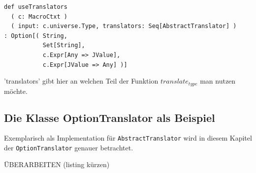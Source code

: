 \documentclass[12pt]{scrreprt}
\begin{document}
\begin{lstlisting}[caption=Statische Hilfsfunktion in AbstractTranslator, label=lst:hilfsfunktionen]
def useTranslators
  ( c: MacroCtxt )
  ( input: c.universe.Type, translators: Seq[AbstractTranslator] )
: Option[( String,
           Set[String], 
           c.Expr[Any => JValue], 
           c.Expr[JValue => Any] )]
\end{lstlisting}

'translators' gibt hier an welchen Teil der Funktion $translate_{type}$ man nutzen möchte.

\subsection{Die Klasse OptionTranslator als Beispiel}

Exemplarisch als Implementation für \lstinline!AbstractTranslator! wird in diesem Kapitel der \lstinline!OptionTranslator! genauer betrachtet.

ÜBERARBEITEN (listing kürzen)
\end{document}
